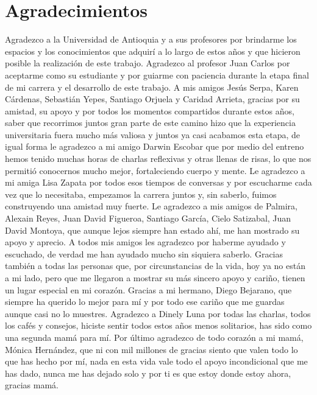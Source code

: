 
\chapter{Agradecimientos}

    Agradezco a la Universidad de Antioquia y a sus profesores por brindarme los 
    espacios y los conocimientos que adquirí a lo largo de estos años y que 
    hicieron posible la realización de este trabajo. Agradezco al profesor Juan 
    Carlos por aceptarme como su estudiante y por guiarme con paciencia durante 
    la etapa final de mi carrera y el desarrollo de este trabajo. A mis amigos 
    Jesús Serpa, Karen Cárdenas, Sebastián Yepes, Santiago Orjuela y Caridad 
    Arrieta, gracias por su amistad, su apoyo y por todos los momentos 
    compartidos durante estos años, saber que recorrimos juntos gran parte de 
    este camino hizo que la experiencia universitaria fuera mucho más valiosa y 
    juntos ya casi acabamos esta etapa, de igual forma le agradezco a mi amigo 
    Darwin Escobar que por medio del entreno hemos tenido muchas horas de 
    charlas reflexivas y otras llenas de risas, lo que nos permitió conocernos 
    mucho mejor, fortaleciendo cuerpo y mente. Le agradezco a mi amiga Lisa 
    Zapata por todos esos tiempos de conversas y por escucharme cada vez que lo 
    necesitaba, empezamos la carrera juntos y, sin saberlo, fuimos construyendo 
    una amistad muy fuerte. Le agradezco a mis amigos de Palmira, Alexain Reyes, 
    Juan David Figueroa, Santiago García, Cielo Satizabal, Juan David Montoya, 
    que aunque lejos siempre han estado ahí, me han mostrado su apoyo y aprecio. 
    A todos mis amigos les agradezco por haberme ayudado y escuchado, de verdad 
    me han ayudado mucho sin siquiera saberlo. Gracias también a todas las 
    personas que, por circunstancias de la vida, hoy ya no están a mi lado, pero 
    que me llegaron a mostrar su más sincero apoyo y cariño, tienen un lugar 
    especial en mi corazón. Gracias a mi hermano, Diego Bejarano, que siempre ha 
    querido lo mejor para mí y por todo ese cariño que me guardas aunque casi no 
    lo muestres. Agradezco a Dinely Luna por todas las charlas, todos los cafés 
    y consejos, hiciste sentir todos estos años menos solitarios, has sido como 
    una segunda mamá para mí. Por último agradezco de todo corazón a mi mamá, 
    Mónica Hernández, que ni con mil millones de gracias siento que valen todo 
    lo que has hecho por mí, nada en esta vida vale todo el apoyo incondicional 
    que me has dado, nunca me has dejado solo y por ti es que estoy donde estoy 
    ahora, gracias mamá.
